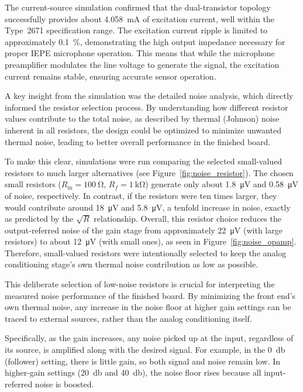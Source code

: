 The current-source simulation confirmed that the dual-transistor topology successfully provides about \SI{4.058}{\milli\ampere} of excitation current, well within the Type~2671 specification range. The excitation current ripple is limited to approximately \SI{0.1}{\percent}, demonstrating the high output impedance necessary for proper IEPE microphone operation. This means that while the microphone preamplifier modulates the line voltage to generate the signal, the excitation current remains stable, ensuring accurate sensor operation. 

A key insight from the simulation was the detailed noise analysis, which directly informed the resistor selection process. By understanding how different resistor values contribute to the total noise, as described by thermal (Johnson) noise inherent in all resistors, the design could be optimized to minimize unwanted thermal noise, leading to better overall performance in the finished board.

To make this clear, simulations were run comparing the selected small-valued resistors to much larger alternatives (see Figure~\ref{fig:noise_resistor}). The chosen small resistors ($R_\mathrm{in}=\SI{100}{\ohm}$, $R_f=\SI{1}{\kilo\ohm}$) generate only about \SI{1.8}{\micro\volt} and \SI{0.58}{\micro\volt} of noise, respectively. In contrast, if the resistors were ten times larger, they would contribute around \SI{18}{\micro\volt} and \SI{5.8}{\micro\volt}, a tenfold increase in noise, exactly as predicted by the $\sqrt{R}$ relationship. Overall, this resistor choice reduces the output-referred noise of the gain stage from approximately \SI{22}{\micro\volt} (with large resistors) to about \SI{12}{\micro\volt} (with small ones), as seen in Figure~\ref{fig:noise_opamp}. Therefore, small-valued resistors were intentionally selected to keep the analog conditioning stage’s own thermal noise contribution as low as possible.

This deliberate selection of low-noise resistors is crucial for interpreting the measured noise performance of the finished board. By minimizing the front end’s own thermal noise, any increase in the noise floor at higher gain settings can be traced to external sources, rather than the analog conditioning itself. 

Specifically, as the gain increases, any noise picked up at the input, regardless of its source, is amplified along with the desired signal. For example, in the \SI{0}{\decibel} (follower) setting, there is little gain, so both signal and noise remain low. In higher-gain settings (\SI{20}{\decibel} and \SI{40}{\decibel}), the noise floor rises because all input-referred noise is boosted. 

